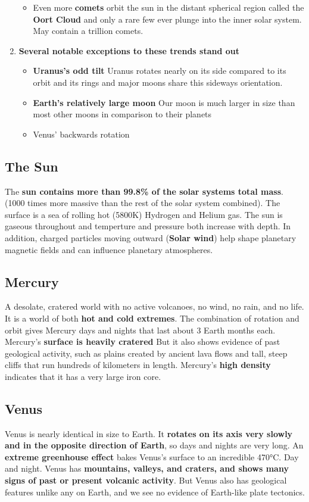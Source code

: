 \begin{enumerate}
\begin{itemize}
\item Even more {\bf comets} orbit the sun in the distant spherical region called the {\bf Oort Cloud} and only a rare few ever plunge into the inner solar system. May contain a trillion comets.
\end{itemize}
\item {\bf Several notable exceptions to these trends stand out}
\begin{itemize}
\item {\bf Uranus's odd tilt} Uranus rotates nearly on its side compared to its orbit and its rings and major moons share this sideways orientation.
\item {\bf Earth's relatively large moon} Our moon is much larger in size than most other moons in comparison to their planets
\item {Venus' backwards rotation}
\end{itemize}
\end{enumerate}

\subsection{The Sun}
The {\bf sun contains more than 99.8\% of the solar systems total mass}. (1000 times more massive than the rest of the solar system combined). The surface is a sea of rolling hot (5800K) Hydrogen and Helium gas. The sun is gaseous throughout and temperture and pressure both increase with depth. In addition, charged particles moving outward ({\bf Solar wind}) help shape planetary magnetic fields and can influence planetary atmospheres.

\subsection{Mercury}
A desolate, cratered world with no active volcanoes, no wind, no rain, and no life. It is a world of both {\bf hot and cold extremes}. The combination of rotation and orbit gives Mercury days and nights that last about 3 Earth months each. Mercury’s {\bf surface is heavily cratered} But it also shows evidence of past geological activity, such as plains created
by ancient lava flows and tall, steep cliffs that run hundreds of kilometers in length. Mercury’s {\bf high density} indicates that it has a very large iron core.

\subsection{Venus}
Venus is nearly identical in size to Earth. It {\bf rotates on its axis very slowly and in the opposite direction of Earth}, so days and nights are very long. An {\bf extreme greenhouse effect} bakes Venus’s surface to an incredible 470°C. Day and night. Venus has {\bf mountains, valleys, and craters, and shows many signs of past or present volcanic activity}. But Venus also has geological features unlike any on Earth, and we see no evidence of Earth-like plate tectonics.

